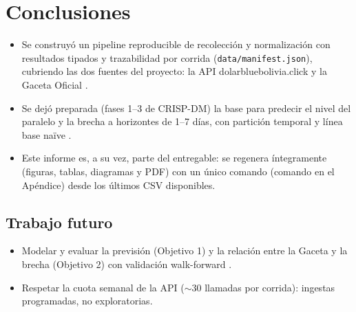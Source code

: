 \section{Conclusiones}
\label{sec:conclusiones}

\begin{itemize}
  \item Se construyó un pipeline reproducible de recolección y normalización
        con resultados tipados y trazabilidad por corrida
        (\texttt{data/manifest.json}), cubriendo las dos fuentes del proyecto: la API
        dolarbluebolivia.click y la Gaceta Oficial \cite{dolarblue2026api}.
  \item Se dejó preparada (fases 1--3 de CRISP-DM) la base para predecir el
        nivel del paralelo y la brecha a horizontes de 1--7 días, con
        partición temporal y línea base naïve \cite{hyndman2021forecasting}.
  \item Este informe es, a su vez, parte del entregable: se regenera
        íntegramente (figuras, tablas, diagramas y PDF) con un único comando
        (comando en el Apéndice) desde los últimos CSV disponibles.
\end{itemize}

\subsection{Trabajo futuro}

\begin{itemize}
  \item Modelar y evaluar la previsión (Objetivo 1) y la relación entre la
        Gaceta y la brecha (Objetivo 2) con validación walk-forward
        \cite{box2015timeseries}.
  \item Respetar la cuota semanal de la API ($\sim$30 llamadas por corrida):
        ingestas programadas, no exploratorias.
\end{itemize}
